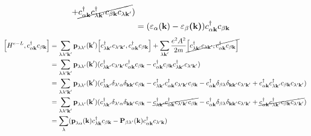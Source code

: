 \documentclass[12pt,english,a4paper]{article}
\newcommand{\dg}{\dagger}
\begin{document}
\begin{appendices}
\begin{align}
	+ \cancel{c^\dg_{\alpha \textbf{k}}c^\dg_{\lambda \textbf{k}'} c_{\beta \textbf{k}} c_{\lambda \textbf{k}'}})\nonumber\\\label{Energy commu}
	&= (\varepsilon_\alpha(\textbf{k}) - \varepsilon_{\beta}\textbf{(k)})c^\dg_{\alpha\textbf{k}} c_{\beta\textbf{k}}
\end{align}
\begin{align}
	\comm{H^{e-L}}{c^\dg_{\alpha \textbf{k}} c_{\beta \textbf{k}}} &= \sum_{\lambda\lambda' \textbf{k}'}\textbf{p}_{\lambda\lambda'}(\textbf{k}')\comm{c^\dg_{\lambda\textbf{k}'}c_{\lambda'\textbf{k}'}}{c_{\alpha \textbf{k}}^\dg c_{\beta \textbf{k}}} + \sum_{\lambda\textbf{k}'} \frac{e^2 A^2}{2m} \cancel{\comm{c^\dg_{\lambda\textbf{k}'}c_{\lambda \textbf{k}'}}{c_{\alpha\textbf{k}}^\dg c_{\beta \textbf{k}}}}\nonumber \\
	&=\sum_{\lambda\lambda' \textbf{k}'}\textbf{p}_{\lambda\lambda'}(\textbf{k}')(c^\dg_{\lambda\textbf{k}'}c_{\lambda'\textbf{k}'}c_{\alpha \textbf{k}}^\dg c_{\beta \textbf{k}} - c_{\alpha \textbf{k}}^\dg c_{\beta \textbf{k}}c^\dg_{\lambda\textbf{k}'}c_{\lambda'\textbf{k}'})\nonumber  \nonumber\\
	&=\sum_{\lambda\lambda' \textbf{k}'}\textbf{p}_{\lambda\lambda'}(\textbf{k}')(c^\dg_{\lambda\textbf{k}'}\delta_{\lambda'\alpha} \delta_{\textbf{k}\textbf{k}'}c_{\beta \textbf{k}} -c^\dg_{\lambda\textbf{k}'}c_{\alpha \textbf{k}}^\dg c_{\lambda'\textbf{k}'}c_{\beta \textbf{k}}
	- c_{\alpha \textbf{k}}^\dg \delta_{\beta \lambda}\delta_{\textbf{k}\textbf{k}'} c_{\lambda'\textbf{k}'}
	+ c_{\alpha \textbf{k}}^\dg c^\dg_{\lambda\textbf{k}'} c_{\beta \textbf{k}}c_{\lambda'\textbf{k}'}
	)\nonumber\\
	&= \sum_{\lambda\lambda' \textbf{k}'}\textbf{p}_{\lambda\lambda'}(\textbf{k}')(c^\dg_{\lambda\textbf{k}'}\delta_{\lambda'\alpha} \delta_{\textbf{k}\textbf{k}'}c_{\beta \textbf{k}} -\cancel{c^\dg_{\lambda\textbf{k}'}c_{\alpha \textbf{k}}^\dg c_{\lambda'\textbf{k}'}c_{\beta \textbf{k}}}
	- c_{\alpha \textbf{k}}^\dg \delta_{\beta \lambda}\delta_{\textbf{k}\textbf{k}'} c_{\lambda'\textbf{k}'}
	+ \cancel{c_{\alpha \textbf{k}}^\dg c^\dg_{\lambda\textbf{k}'} c_{\beta \textbf{k}}c_{\lambda'\textbf{k}'}}
	)\nonumber\\ \label{Interaction commu}
	&= \sum_{\lambda}(\textbf{p}_{\lambda \alpha}(\textbf{k}) c^\dg_{\lambda \textbf{k}} c_{\beta \textbf{k}} - \textbf{P}_{\beta\lambda'}(\textbf{k}) c^\dg_{\alpha\textbf{k}}c_{\lambda'\textbf{k}})
\end{align}
\begin{align}

\end{align}
\end{appendices}
\end{document}
